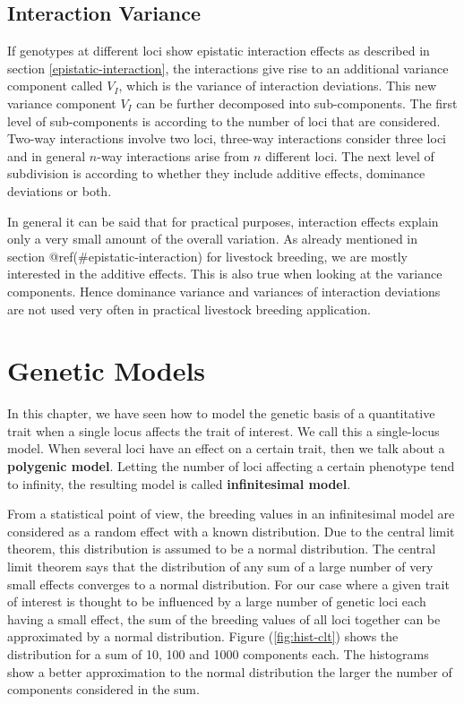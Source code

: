 \documentclass[
]{book}
\theoremstyle{definition}
\theoremstyle{definition}
\theoremstyle{definition}
\theoremstyle{remark}
\begin{document}
\hypertarget{interaction-variance}{%
\subsection{Interaction Variance}\label{interaction-variance}}

If genotypes at different loci show epistatic interaction effects as described in section \ref{epistatic-interaction}, the interactions give rise to an additional variance component called \(V_I\), which is the variance of interaction deviations. This new variance component \(V_I\) can be further decomposed into sub-components. The first level of sub-components is according to the number of loci that are considered. Two-way interactions involve two loci, three-way interactions consider three loci and in general \(n\)-way interactions arise from \(n\) different loci. The next level of subdivision is according to whether they include additive effects, dominance deviations or both.

In general it can be said that for practical purposes, interaction effects explain only a very small amount of the overall variation. As already mentioned in section @ref(\#epistatic-interaction) for livestock breeding, we are mostly interested in the additive effects. This is also true when looking at the variance components. Hence dominance variance and variances of interaction deviations are not used very often in practical livestock breeding application.

\hypertarget{genetic-models}{%
\section{Genetic Models}\label{genetic-models}}

In this chapter, we have seen how to model the genetic basis of a quantitative trait when a single locus affects the trait of interest. We call this a single-locus model. When several loci have an effect on a certain trait, then we talk about a \textbf{polygenic model}. Letting the number of loci affecting a certain phenotype tend to infinity, the resulting model is called \textbf{infinitesimal model}.

From a statistical point of view, the breeding values in an infinitesimal model are considered as a random effect with a known distribution. Due to the central limit theorem, this distribution is assumed to be a normal distribution. The central limit theorem says that the distribution of any sum of a large number of very small effects converges to a normal distribution. For our case where a given trait of interest is thought to be influenced by a large number of genetic loci each having a small effect, the sum of the breeding values of all loci together can be approximated by a normal distribution. Figure (\ref{fig:hist-clt}) shows the distribution for a sum of 10, 100 and 1000 components each. The histograms show a better approximation to the normal distribution the larger the number of components considered in the sum.
\end{document}
